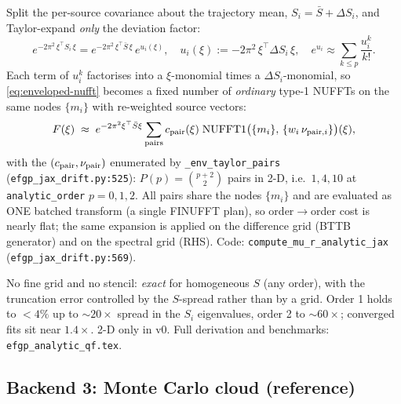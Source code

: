 \documentclass[11pt]{article}
\newcommand{\code}[1]{\texttt{\small #1}}
\begin{document}
Split the per-source covariance about the trajectory mean,
$S_i = \bar S + \Delta S_i$, and Taylor-expand \emph{only} the deviation
factor:
\begin{equation}
e^{-2\pi^2\,\xi^\top S_i\,\xi}
= e^{-2\pi^2\,\xi^\top \bar S\,\xi}\, e^{u_i(\xi)},
\quad u_i(\xi):=-2\pi^2\,\xi^\top \Delta S_i\,\xi,
\quad e^{u_i}\approx\sum_{k\le p}\frac{u_i^k}{k!}.
\label{eq:env-taylor}
\end{equation}
Each term of $u_i^k$ factorises into a $\xi$-monomial times a
$\Delta S_i$-monomial, so \eqref{eq:enveloped-nufft} becomes a fixed
number of \emph{ordinary} type-1 NUFFTs on the same nodes $\{m_i\}$ with
re-weighted source vectors:
\begin{equation}
F(\xi)\;\approx\;e^{-2\pi^2\xi^\top\bar S\xi}
\sum_{\rm pairs} c_{\rm pair}(\xi)\;
\mathrm{NUFFT1}\bigl(\{m_i\},\,\{w_i\,\nu_{{\rm pair},i}\}\bigr)(\xi),
\label{eq:analytic-final}
\end{equation}
with the $(c_{\rm pair},\nu_{\rm pair})$ enumerated by
\code{\_env\_taylor\_pairs} (\code{efgp\_jax\_drift.py:525}):
$P(p)=\binom{p+2}{2}$ pairs in 2-D, i.e.\ $1, 4, 10$ at
\code{analytic\_order} $p=0,1,2$. All pairs share the nodes $\{m_i\}$ and
are evaluated as ONE batched transform (a single FINUFFT plan), so
order$\to$order cost is nearly flat; the same expansion is applied on the
difference grid (BTTB generator) and on the spectral grid (RHS).
Code: \code{compute\_mu\_r\_analytic\_jax}
(\code{efgp\_jax\_drift.py:569}).

No fine grid and no stencil: \emph{exact} for homogeneous $S$ (any order),
with the truncation error controlled by the $S$-spread rather than by a
grid. Order 1 holds to ${<}4\%$ up to ${\sim}20\times$ spread in the
$S_i$ eigenvalues, order 2 to ${\sim}60\times$; converged fits sit near
$1.4\times$. 2-D only in v0. Full derivation and benchmarks:
\texttt{efgp\_analytic\_qf.tex}.

\subsection{Backend 3: Monte Carlo cloud (reference)}
\label{sec:mc}
\end{document}
